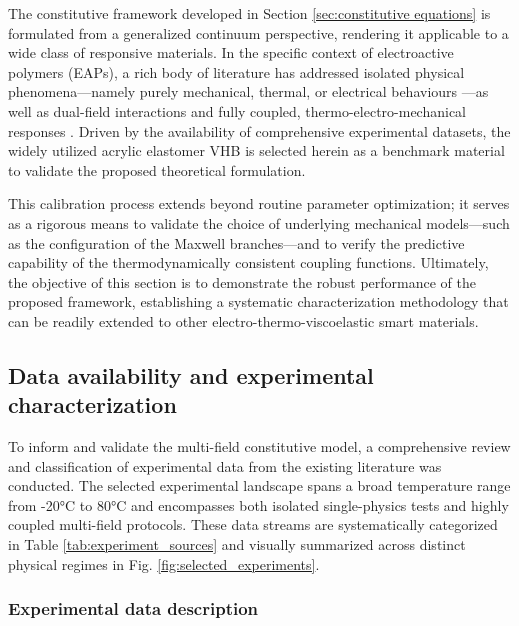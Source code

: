 
The constitutive framework developed in Section \ref{sec:constitutive equations} is formulated from a generalized continuum perspective, rendering it applicable to a wide class of responsive materials. In the specific context of electroactive polymers (EAPs), a rich body of literature has addressed isolated physical phenomena—namely purely mechanical, thermal, or electrical behaviours \cite{Hossain2012visco,Dippel2015}—as well as dual-field interactions \cite{Liao_Mokarram2020,Alkhoury2022} and fully coupled, thermo-electro-mechanical responses \cite{Mehnert2021a,Sheng2012,Qin2023}. Driven by the availability of comprehensive experimental datasets, the widely utilized acrylic elastomer VHB is selected herein as a benchmark material to validate the proposed theoretical formulation. 

This calibration process extends beyond routine parameter optimization; it serves as a rigorous means to validate the choice of underlying mechanical models—such as the configuration of the Maxwell branches—and to verify the predictive capability of the thermodynamically consistent coupling functions. Ultimately, the objective of this section is to demonstrate the robust performance of the proposed framework, establishing a systematic characterization methodology that can be readily extended to other electro-thermo-viscoelastic smart materials.


\subsection{Data availability and experimental characterization}
\label{sec:experimental_data}

To inform and validate the multi-field constitutive model, a comprehensive review and classification of experimental data from the existing literature was conducted. The selected experimental landscape spans a broad temperature range from -20°C to 80°C and encompasses both isolated single-physics tests and highly coupled multi-field protocols. These data streams are systematically categorized in Table \ref{tab:experiment_sources} and visually summarized across distinct physical regimes in Fig. \ref{fig:selected_experiments}.


\subsubsection{Experimental data description}

